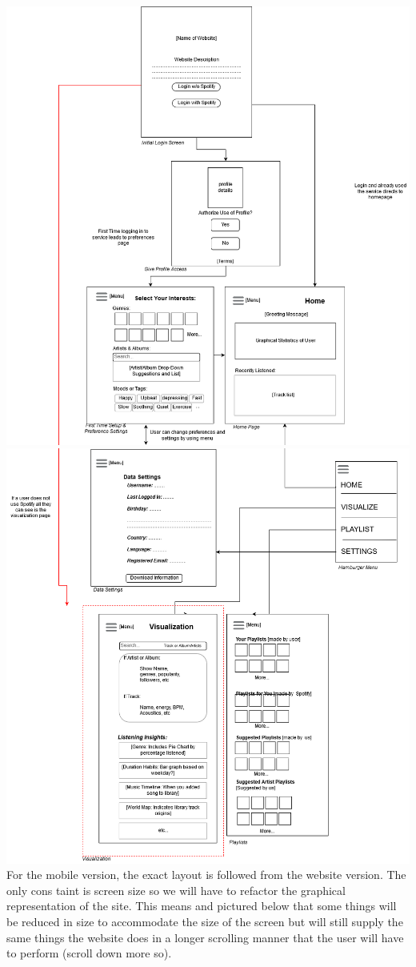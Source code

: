 \documentclass[letter, 11pt]{article}
\begin{document}
\includegraphics[scale=0.57,left]{storyboard_1_mobile.png} \\

\includegraphics[scale=0.57,left]{storyboard_2_mobile.png}\\
For the mobile version, the exact layout is followed from the website version. The only cons taint is screen size so we will have to refactor the graphical representation of the site. This means and pictured below that some things will be reduced in size to accommodate the size of the screen but will still supply the same things the website does in a longer scrolling manner that the user will have to perform (scroll down more so).\\
\end{document}

